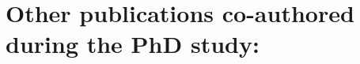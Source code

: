 \section*{Other publications co-authored during the PhD study:}

\nocite{*}
\begingroup
\renewcommand{\chapter}[2]{}%

%

\endgroup

%
